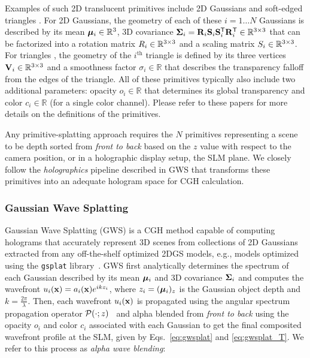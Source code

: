 Examples of such 2D translucent primitives include 2D Gaussians \cite{huang20242d} and soft-edged triangles \cite{Held2025Triangle, sheng20252dtrianglesplattingdirect, burgdorfer2025radianttrianglesoupsoft}. For 2D Gaussians, the geometry of each of these $i=1 \ldots N$ Gaussians is described by its mean $\bm{\mu}_i \in \mathbb{R}^3$, 3D covariance $\mathbf{\Sigma}_i=\mathbf{R}_i \mathbf{S}_i \mathbf{S}_i^\mathsf{T} \mathbf{R}_i^\mathsf{T} \in \mathbb{R}^{{3}\times{3}}$ that can be factorized into a rotation matrix $R_i \in \mathbb{R}^{{3}\times{3}}$ and a scaling matrix $S_i \in \mathbb{R}^{{3}\times{3}}$. For triangles \cite{Held20243DConvex}, the geometry of the $i^{\text{th}}$ triangle is defined by its three vertices $\mathbf{V}_i \in \mathbb{R}^{{3}\times{3}}$ and a smoothness factor $\sigma_i\in \mathbb{R}$ that describes the transparency falloff from the edges of the triangle. All of these primitives typically also include two additional parameters: opacity $o_i \in \mathbb{R}$ that determines its global transparency and color $c_i \in \mathbb{R}$ (for a single color channel). Please refer to these papers for more details on the definitions of the primitives.


Any primitive-splatting approach requires the $N$ primitives representing a scene to be depth sorted from \textit{front to back} based on the $z$ value with respect to the camera position, or in a holographic display setup, the SLM plane. We closely follow the \textit{holographics} pipeline described in GWS \cite{choi2025gaussian} that transforms these primitives into an adequate hologram space for CGH calculation.

\subsubsection{Gaussian Wave Splatting}
Gaussian Wave Splatting (GWS) \cite{choi2025gaussian} is a CGH method capable of computing holograms that accurately represent 3D scenes from collections of 2D Gaussians \cite{huang20242d} extracted from any off-the-shelf optimized 2DGS models, e.g., models optimized using the \texttt{gsplat} library~\cite{ye2024gsplat}. GWS first analytically determines the spectrum of each Gaussian described by its mean $\bm{\mu}_i$ and 3D covariance $\mathbf{\Sigma}_i$ and computes the wavefront  $u_i(\mathbf{x})=a_i(\mathbf{x})e^{ikz_i}$, where $z_i = (\bm{\mu}_i)_z$ is the Gaussian object depth and $k = \frac{2\pi}{\lambda}$. Then, each wavefront $u_i(\mathbf{x})$ is propagated using the angular spectrum propagation operator $\mathcal{P}(\cdot; z)$~\cite{goodman2005introduction, matsushima2009band} and alpha blended from \textit{front to back} using the opacity $o_i$ and color $c_i$ associated with each Gaussian to get the final composited wavefront profile at the SLM, given by Eqs.~\ref{eq:gwsplat} and \ref{eq:gwsplat_T}. We refer to this process as \textit{alpha wave blending}:
%

